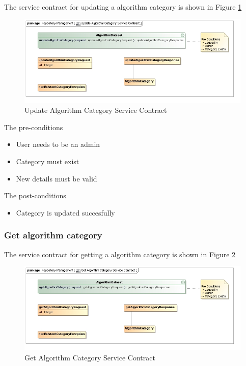 The service contract for updating a algorithm category is shown in Figure \ref{fig:updateAlgorithmCatService}
\begin{figure}[H]
  \begin{center}
  \includegraphics[scale=0.6]{../Diagrams and Charts/Test Data/Update Algorithm Category Service Contract.jpg}
  \caption{Update Algorithm Category Service Contract}
  \label{fig:updateAlgorithmCatService}
  \end{center}
  
\end{figure}


The pre-conditions
\begin{itemize}
  \item User needs to be an admin
  \item Category must exist
  \item New details must be valid
\end{itemize}

The post-conditions
\begin{itemize}
  \item Category is updated succesfully
\end{itemize}
\subsubsection {Get algorithm category}

The service contract for getting a algorithm category is shown in Figure \ref{fig:getAlgorithmCatService}
\begin{figure}[H]
  \begin{center}
  \includegraphics[scale=0.6]{../Diagrams and Charts/Test Data/Get Algorithm Category Service Contract.jpg}
  \caption{Get Algorithm Category Service Contract}
  \label{fig:getAlgorithmCatService}
  \end{center}
  
\end{figure}

